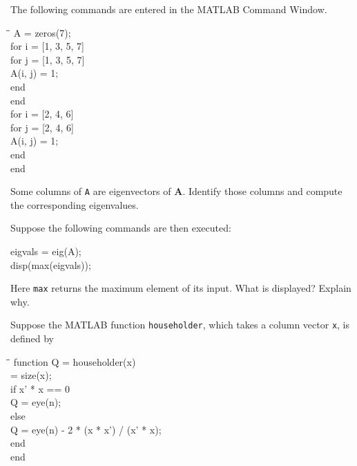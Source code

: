 \documentclass[11pt,oneside]{article}
\begin{document}
\begin{problem}
The following commands are entered in the MATLAB Command Window.

{\small\ttfamily
\begin{tabbing}
\hspace{2em}\=\hspace{2em}\=\kill
A = zeros(7);\\
for i = [1, 3, 5, 7]\\
\>for j = [1, 3, 5, 7]\\
\>\>A(i, j) = 1;\\
\>end\\
end\\
for i = [2, 4, 6]\\
\>for j = [2, 4, 6]\\
\>\>A(i, j) = 1;\\
\>end\\
end
\end{tabbing}
}

\begin{problemsubparts}
\item Some columns of \texttt{A} are eigenvectors of $\mathbf A$. Identify those columns and compute the corresponding eigenvalues.
\item Suppose the following commands are then executed:

{\small\ttfamily
\begin{tabbing}
eigvals = eig(A);\\
disp(max(eigvals));
\end{tabbing}
}

Here \texttt{max} returns the maximum element of its input. What is displayed? Explain why.
\end{problemsubparts}

Suppose the MATLAB function \texttt{householder}, which takes a column vector \texttt{x}, is defined by

{\small\ttfamily
\begin{tabbing}
\hspace{2em}\=\hspace{2em}\=\kill
function Q = householder(x)\\
\>[n, m] = size(x);\\
\>if x' * x == 0\\
\>\>Q = eye(n);\\
\>else\\
\>\>Q = eye(n) - 2 * (x * x') / (x' * x);\\
\>end\\
end
\end{tabbing}
}


\end{problem}
\end{document}
